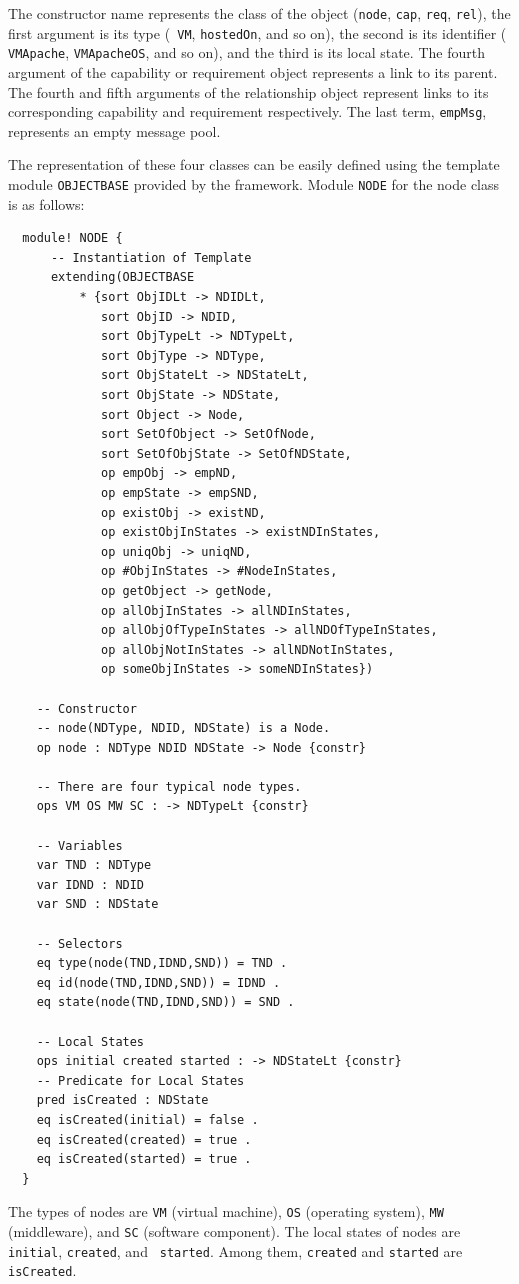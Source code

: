 \documentclass[12pt]{report}
\begin{document}
\normalsize
The constructor name represents the class of the object ({\tt node},
{\tt cap}, {\tt req}, {\tt rel}), the first argument is its type ({\tt
  VM}, {\tt hostedOn}, and so on), the second is its identifier ({\tt
  VMApache}, {\tt VMApacheOS}, and so on), and the third is its local
state.  The fourth argument of the capability or requirement object
represents a link to its parent.  The fourth and fifth arguments of
the relationship object represent links to its corresponding
capability and requirement respectively. The last term, {\tt empMsg},
represents an empty message pool.

The representation of these four classes can be easily defined using the
template module {\tt OBJECTBASE} provided by the framework. Module
{\tt NODE} for the node class is as follows:
\small
\begin{verbatim}
  module! NODE {
      -- Instantiation of Template
      extending(OBJECTBASE
          * {sort ObjIDLt -> NDIDLt,
             sort ObjID -> NDID,
             sort ObjTypeLt -> NDTypeLt,
             sort ObjType -> NDType,
             sort ObjStateLt -> NDStateLt,
             sort ObjState -> NDState,
             sort Object -> Node,
             sort SetOfObject -> SetOfNode,
             sort SetOfObjState -> SetOfNDState,
             op empObj -> empND,
             op empState -> empSND,
             op existObj -> existND,
             op existObjInStates -> existNDInStates,
             op uniqObj -> uniqND,
             op #ObjInStates -> #NodeInStates,
             op getObject -> getNode,
             op allObjInStates -> allNDInStates,
             op allObjOfTypeInStates -> allNDOfTypeInStates,
             op allObjNotInStates -> allNDNotInStates,
             op someObjInStates -> someNDInStates})
    
    -- Constructor
    -- node(NDType, NDID, NDState) is a Node.
    op node : NDType NDID NDState -> Node {constr}
  
    -- There are four typical node types.
    ops VM OS MW SC : -> NDTypeLt {constr}
  
    -- Variables
    var TND : NDType
    var IDND : NDID
    var SND : NDState
  
    -- Selectors
    eq type(node(TND,IDND,SND)) = TND .
    eq id(node(TND,IDND,SND)) = IDND .
    eq state(node(TND,IDND,SND)) = SND .
  
    -- Local States
    ops initial created started : -> NDStateLt {constr}
    -- Predicate for Local States
    pred isCreated : NDState
    eq isCreated(initial) = false .
    eq isCreated(created) = true .
    eq isCreated(started) = true .
  }
\end{verbatim}
\normalsize
The types of nodes are {\tt VM} (virtual machine), {\tt OS} (operating
system), {\tt MW} (middleware), and {\tt SC} (software component).  The
local states of nodes are {\tt initial}, {\tt created}, and {\tt
  started}. Among them, {\tt created} and {\tt started} are {\tt
  isCreated}.
\end{document}
